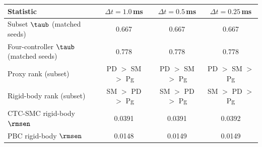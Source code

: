 \begin{tabular}{lccc}
\toprule
Statistic & $\Delta t = 1.0$\,ms & $\Delta t = 0.5$\,ms & $\Delta t = 0.25$\,ms \\
\midrule
Subset $\taub$ (matched seeds) & 0.667 & 0.667 & 0.667 \\
Four-controller $\taub$ (matched seeds) & 0.778 & 0.778 & 0.778 \\
Proxy rank (subset) & PD $>$ SM $>$ Pg & PD $>$ SM $>$ Pg & PD $>$ SM $>$ Pg \\
Rigid-body rank (subset) & SM $>$ PD $>$ Pg & SM $>$ PD $>$ Pg & SM $>$ PD $>$ Pg \\
\midrule
CTC-SMC rigid-body $\rmsen$ & 0.0391 & 0.0391 & 0.0392 \\
PBC rigid-body $\rmsen$ & 0.0148 & 0.0149 & 0.0149 \\
\bottomrule
\end{tabular}
